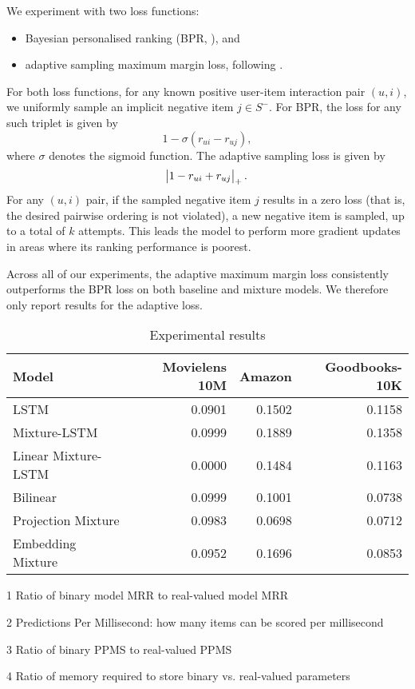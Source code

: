 \documentclass[sigchi]{acmart}
\newcommand\symUserInteractionSet{S}
\begin{document}
We experiment with two loss functions:
\begin{itemize}
\item Bayesian personalised ranking (BPR, \citet{rendle2009bpr}), and
\item adaptive sampling maximum margin loss, following \citet{weston2011wsabie}.
\end{itemize}
For both loss functions, for any known positive user-item interaction pair $(u, i)$, we uniformly sample an implicit negative item $j \in \symUserInteractionSet^-$. For BPR, the loss for any such triplet is given by
\begin{equation}
1 - \sigma\left(r_{ui} - r_{uj}\right),
\end{equation}
where $\sigma$ denotes the sigmoid function.
The adaptive sampling loss is given by
\begin{equation}
\abs{1 - r_{ui} + r_{uj}}_{+}.
\end{equation}
For any $(u, i)$ pair, if the sampled negative item $j$ results in a zero loss (that is, the desired pairwise ordering is not violated), a new negative item is sampled, up to a total of $k$ attempts. This leads the model to perform more gradient updates in areas where its ranking performance is poorest.

Across all of our experiments, the adaptive maximum margin loss consistently outperforms the BPR loss on both baseline and mixture models. We therefore only report results for the adaptive loss.

\begin{table*}[htbp]
\begin{threeparttable}
\caption{Experimental results}
\label{tb:results}
\begin{tabular}{lrrr}
\toprule
 Model               &   Movielens 10M &   Amazon &   Goodbooks-10K \\
\midrule
 LSTM                &          0.0901 &   0.1502 &          0.1158 \\
 Mixture-LSTM        &          0.0999 &   0.1889 &          0.1358 \\
 Linear Mixture-LSTM &          0.0000 &   0.1484 &          0.1163 \\
 \midrule
 Bilinear            &          0.0999 &   0.1001 &          0.0738 \\
 Projection Mixture  &          0.0983 &   0.0698 &          0.0712 \\
 Embedding Mixture   &          0.0952 &   0.1696 &          0.0853 \\
\bottomrule
\end{tabular}
\begin{tablenotes}
\small{
\item[1] Ratio of binary model MRR to real-valued model MRR
\item[2] Predictions Per Millisecond: how many items can be scored per millisecond
\item[3] Ratio of binary PPMS to real-valued PPMS
\item[4] Ratio of memory required to store binary vs. real-valued parameters
}
\end{tablenotes}
\end{threeparttable}
\end{table*}
\end{document}
